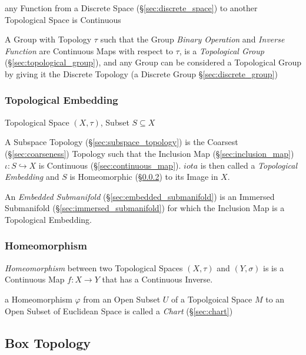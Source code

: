 any Function from a Discrete Space (\S\ref{sec:discrete_space}) to another
Topological Space is Continuous

A Group with Topology $\tau$ such that the Group \emph{Binary Operation} and
\emph{Inverse Function} are Continuous Maps with respect to $\tau$, is a
\emph{Topological Group} (\S\ref{sec:topological_group}), and any Group can be
considered a Topological Group by giving it the Discrete Topology (a Discrete
Group \S\ref{sec:discrete_group})



\subsubsection{Topological Embedding}\label{sec:topological_embedding}

Topological Space $(X,\tau)$, Subset $S \subseteq X$

A Subspace Topology (\S\ref{sec:subspace_topology}) is the Coarsest
(\S\ref{sec:coarseness}) Topology such that the Inclusion Map
(\S\ref{sec:inclusion_map}) $\iota : S \hookrightarrow X$ is
Continuous (\S\ref{sec:continuous_map}). $iota$ is then called a
\emph{Topological Embedding} and $S$ is Homeomorphic
(\S\ref{sec:homeomorphism}) to its Image in $X$.

An \emph{Embedded Submanifold} (\S\ref{sec:embedded_submanifold}) is an
Immersed Submanifold (\S\ref{sec:immersed_submanifold}) for which the Inclusion
Map is a Topological Embedding.



\subsubsection{Homeomorphism}\label{sec:homeomorphism}

\emph{Homeomorphism} between two Topological Spaces $(X, \tau)$ and
$(Y, \sigma)$ is is a Continuous Map $f : X \rightarrow Y$ that has a
Continuous Inverse.

a Homeomorphism $\varphi$ from an Open Subset $U$ of a Topolgoical Space $M$ to
an Open Subset of Euclidean Space is called a \emph{Chart} (\S\ref{sec:chart})



\subsection{Box Topology}\label{sec:box_topology}

